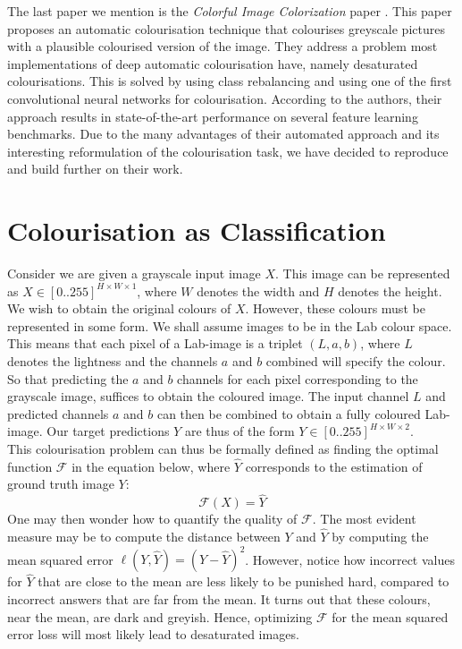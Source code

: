 \documentclass{article}
\begin{document}
The last paper we mention is the \textit{Colorful Image Colorization} paper \cite{colourful}. This paper proposes an automatic colourisation technique that colourises greyscale pictures with a plausible colourised version of the image. They address a problem most implementations of deep automatic colourisation have, namely desaturated colourisations. This is solved by using class rebalancing and using one of the first convolutional neural networks for colourisation. According to the authors, their approach results in state-of-the-art performance on several feature learning benchmarks. Due to the many advantages of their automated approach and its interesting reformulation of the colourisation task, we have decided to reproduce and build further on their work.

\section{Colourisation as Classification}
Consider we are given a grayscale input image $X$. This image can be represented as
$X\in\left[0..255\right]^{H \times W \times 1}$, 
where $W$ denotes the width and $H$ denotes the height. We wish to obtain the original colours of $X$. However, these colours must be represented in some form. We shall assume images to be in the Lab colour space. This means that each pixel of a Lab-image is a triplet $(L, a, b)$, where $L$ denotes the lightness and the channels $a$ and $b$ combined will specify the colour. So that predicting the $a$ and $b$ channels for each pixel corresponding to the grayscale image, suffices to obtain the coloured image. The input channel $L$ and predicted channels $a$ and $b$ can then be combined to obtain a fully coloured Lab-image. Our target predictions $Y$ are thus of the form $Y\in\left[0..255\right]^{H \times W \times 2}$.\\
This colourisation problem can thus be formally defined as finding the optimal function $\mathcal{F}$ in the equation below, where $\hat{Y}$ corresponds to the estimation of ground truth image $Y$:
\[\mathcal{F}\left(X\right)=\hat{Y}\]
One may then wonder how to quantify the quality of $\mathcal{F}$. The most evident measure may be to compute the distance between $Y$ and $\hat{Y}$ by computing the mean squared error $\ell(Y, \hat{Y}) = (Y - \hat{Y})^2$. However, notice how incorrect values
for $\hat{Y}$ that are close to the mean are less likely to be punished hard, compared to incorrect answers that are far from the
mean. It turns out that these colours, near the mean, are dark and greyish. Hence, optimizing $\mathcal{F}$ for the mean squared error loss will most likely lead to desaturated images.
\end{document}
